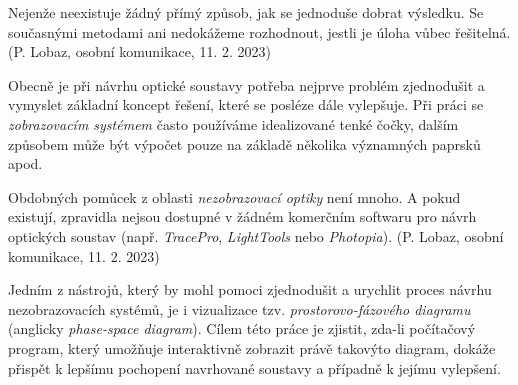 Nejenže neexistuje žádný přímý způsob, jak se jednoduše dobrat výsledku. Se současnými metodami ani nedokážeme rozhodnout, jestli je úloha vůbec řešitelná. (P. Lobaz, osobní komunikace, 11. 2. 2023)

Obecně je při návrhu optické soustavy potřeba nejprve problém zjednodušit a vymyslet základní koncept řešení, které se posléze dále vylepšuje. Při práci se \emph{zobrazovacím systémem} často používáme idealizované tenké čočky, dalším způsobem může být výpočet pouze na základě několika významných paprsků apod.

Obdobných pomůcek z oblasti \emph{nezobrazovací optiky} není mnoho. A pokud existují, zpravidla nejsou dostupné v žádném komerčním softwaru pro návrh optických soustav (např. \emph{TracePro}, \emph{LightTools} nebo \emph{Photopia}). (P. Lobaz, osobní komunikace, 11. 2. 2023)

Jedním z nástrojů, který by mohl pomoci zjednodušit a urychlit proces návrhu nezobrazovacích systémů, je i vizualizace tzv. \emph{prostorovo-fázového diagramu} (anglicky \emph{phase-space diagram}). \parencite{mushaveck2022designing} Cílem této práce je zjistit, zda-li počítačový program, který umožňuje interaktivně zobrazit právě takovýto diagram, dokáže přispět k lepšímu pochopení navrhované soustavy a případně k jejímu vylepšení.